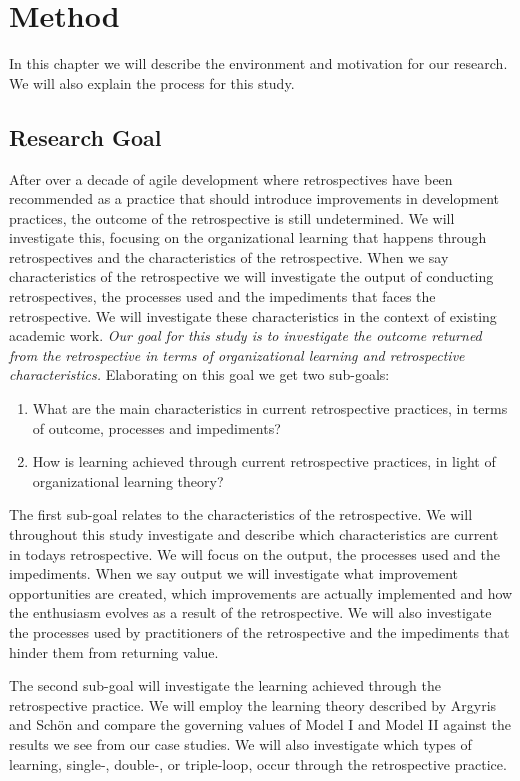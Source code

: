 \chapter{Method}

In this chapter we will describe the environment and motivation for our research. We will also explain the process for this study.

\section{Research Goal}
After over a decade of agile development where retrospectives have been recommended as a practice that should introduce improvements in development practices, the outcome of the retrospective is still undetermined. We will investigate this, focusing on the organizational learning that happens through retrospectives and the characteristics of the retrospective. When we say characteristics of the retrospective we will investigate the output of conducting retrospectives, the processes used and the impediments that faces the retrospective. We will investigate these characteristics in the context of existing academic work. \textit{Our goal for this study is to investigate the outcome returned from the retrospective in terms of organizational learning and retrospective characteristics.} Elaborating on this goal we get two sub-goals: 

\begin{enumerate}
	\item What are the main characteristics in current retrospective practices, in terms of outcome, processes and impediments? 
	\item How is learning achieved through current retrospective practices, in light of organizational learning theory? 
\end{enumerate}

The first sub-goal relates to the characteristics of the retrospective. We will throughout this study investigate and describe which characteristics are current in todays retrospective. We will focus on the output, the processes used and the impediments. When we say output we will investigate what improvement opportunities are created, which improvements are actually implemented and how the enthusiasm evolves as a result of the retrospective. We will also investigate the processes used by practitioners of the retrospective and the impediments that hinder them from returning value. 

The second sub-goal will investigate the learning achieved through the retrospective practice. We will employ the learning theory described by Argyris and Schön \cite{Argyris1996} and compare the governing values of Model I and Model II against the results we see from our case studies. We will also investigate which types of learning, single-, double-, or triple-loop, occur through the retrospective practice. 

